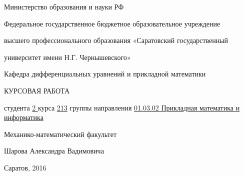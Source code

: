 \newcommand{\toCenter}[1]{\begin{center}#1\par\end{center}}
\newcommand{\toRight}[1]{\begin{flushright}#1\par\end{flushright}}
\newcommand{\toLeft}[1]{\begin{flushleft}#1\par\end{flushleft}}

\begin{titlepage} 

\thispagestyle{empty} 
\centerline{Министерство образования и науки РФ} 
\centerline{Федеральное государственное бюджетное образовательное учреждение} 
\centerline{высшего профессионального образования «Саратовский государственный} 
\centerline{университет имени Н.Г. Чернышевского»}

\medskip

\toRight{Кафедра дифференциальных уравнений и прикладной математики}

\begin{center}
\large КУРСОВАЯ РАБОТА
\medskip

\toLeft{студента \underline{ 2 } курса \underline{213} группы \newline направления \underline{01.03.02 Прикладная математика и информатика}}

\toCenter{Механико-математический факультет

Шарова Александра Вадимовича}



\medskip
\end{center}

\medskip

\vfill%
\toCenter{Саратов, 2016}
\clearpage 
\end{titlepage} 